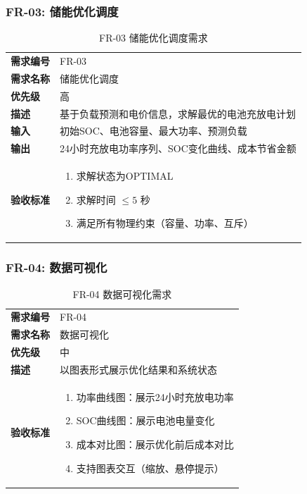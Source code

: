 \subsubsection{FR-03: 储能优化调度}

\begin{table}[H]
  \centering
  \caption{FR-03 储能优化调度需求}
  \begin{tabular}{p{3cm}p{10cm}}
    \toprule
    \textbf{需求编号} & FR-03                      \\
    \textbf{需求名称} & 储能优化调度                     \\
    \textbf{优先级}  & 高                          \\
    \textbf{描述}   & 基于负载预测和电价信息，求解最优的电池充放电计划   \\
    \textbf{输入}   & 初始SOC、电池容量、最大功率、预测负载       \\
    \textbf{输出}   & 24小时充放电功率序列、SOC变化曲线、成本节省金额 \\
    \textbf{验收标准} &
    \begin{enumerate}[leftmargin=*, nosep]
      \item 求解状态为OPTIMAL
      \item 求解时间 $\leq 5$ 秒
      \item 满足所有物理约束（容量、功率、互斥）
    \end{enumerate}      \\
    \bottomrule
  \end{tabular}
\end{table}

\subsubsection{FR-04: 数据可视化}

\begin{table}[htbp]
  \centering
  \caption{FR-04 数据可视化需求}
  \begin{tabular}{p{3cm}p{10cm}}
    \toprule
    \textbf{需求编号} & FR-04                 \\
    \textbf{需求名称} & 数据可视化                 \\
    \textbf{优先级}  & 中                     \\
    \textbf{描述}   & 以图表形式展示优化结果和系统状态      \\
    \textbf{验收标准} &
    \begin{enumerate}[leftmargin=*, nosep]
      \item 功率曲线图：展示24小时充放电功率
      \item SOC曲线图：展示电池电量变化
      \item 成本对比图：展示优化前后成本对比
      \item 支持图表交互（缩放、悬停提示）
    \end{enumerate} \\
    \bottomrule
  \end{tabular}
\end{table}

